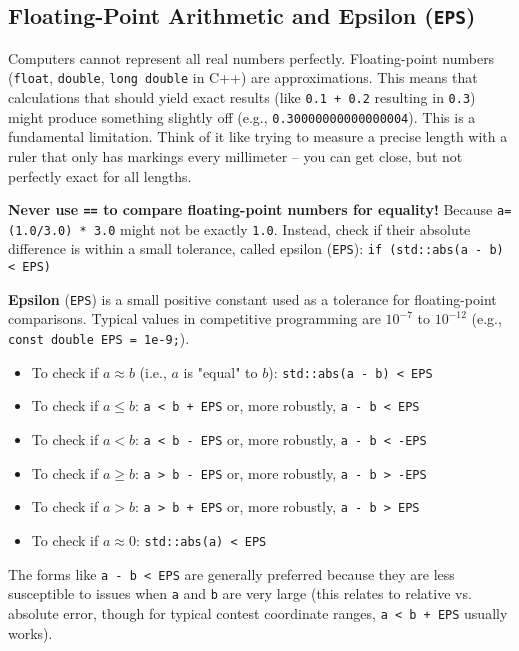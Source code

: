 \subsection{Floating-Point Arithmetic and Epsilon (\texttt{EPS})}
\label{ssec:A.3.1}

\begin{intuition}
\label{intuition:A.3.1.floats_are_approx}
Computers cannot represent all real numbers perfectly. Floating-point numbers (\texttt{float}, \texttt{double}, \texttt{long double} in C++) are approximations. This means that calculations that should yield exact results (like \texttt{0.1 + 0.2} resulting in \texttt{0.3}) might produce something slightly off (e.g., \texttt{0.30000000000000004}). This is a fundamental limitation. Think of it like trying to measure a precise length with a ruler that only has markings every millimeter – you can get close, but not perfectly exact for all lengths.
\end{intuition}

\begin{warning}
\label{warn:A.3.1.float_equality}
\textbf{Never use \texttt{==} to compare floating-point numbers for equality!}
Because \texttt{a=(1.0/3.0) * 3.0} might not be exactly \texttt{1.0}.
Instead, check if their absolute difference is within a small tolerance, called epsilon (\texttt{EPS}):
\texttt{if (std::abs(a - b) < EPS)}
\end{warning}

\begin{definition}
\label{def:A.3.1.eps}
\textbf{Epsilon} (\texttt{EPS}) is a small positive constant used as a tolerance for floating-point comparisons. Typical values in competitive programming are $10^{-7}$ to $10^{-12}$ (e.g., \texttt{const double EPS = 1e-9;}).
\begin{itemize}
    \item To check if $a \approx b$ (i.e., $a$ is "equal" to $b$): \texttt{std::abs(a - b) < EPS}
    \item To check if $a \le b$: \texttt{a < b + EPS} or, more robustly, \texttt{a - b < EPS}
    \item To check if $a < b$: \texttt{a < b - EPS} or, more robustly, \texttt{a - b < -EPS}
    \item To check if $a \ge b$: \texttt{a > b - EPS} or, more robustly, \texttt{a - b > -EPS}
    \item To check if $a > b$: \texttt{a > b + EPS} or, more robustly, \texttt{a - b > EPS}
    \item To check if $a \approx 0$: \texttt{std::abs(a) < EPS}
\end{itemize}
The forms like \texttt{a - b < EPS} are generally preferred because they are less susceptible to issues when \texttt{a} and \texttt{b} are very large (this relates to relative vs. absolute error, though for typical contest coordinate ranges, \texttt{a < b + EPS} usually works).
\end{definition}

